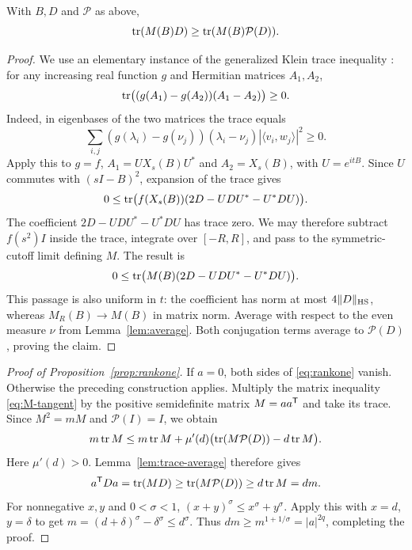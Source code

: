 \begin{lemma}\label{lem:trace-average}
With $B,D$ and $\mathcal P$ as above,
\begin{equation}\label{eq:trace-average}
 \operatorname{tr}(M(B)D)\ge\operatorname{tr}(M(B)\mathcal P(D)).
\end{equation}
\end{lemma}
\begin{proof}
We use an elementary instance of the generalized Klein trace inequality
\cite[Proposition~3, p.~289]{Petz1994}: for any increasing real function $g$ and
Hermitian matrices $A_1,A_2$,
\begin{equation}\label{eq:trace-monotonicity}
 \operatorname{tr}\bigl((g(A_1)-g(A_2))(A_1-A_2)\bigr)\ge0.
\end{equation}
Indeed, in eigenbases of the two matrices the trace equals
\[
 \sum_{i,j}(g(\lambda_i)-g(\nu_j))(\lambda_i-\nu_j)
       |\langle v_i,w_j\rangle|^2\ge0.
\]
Apply this to $g=f$, $A_1=UX_s(B)U^*$ and $A_2=X_s(B)$, with
$U=e^{itB}$. Since $U$ commutes with $(sI-B)^2$, expansion of the trace gives
\begin{equation}\label{eq:trace-fixed-s}
 0\le\operatorname{tr}\bigl(f(X_s(B))(2D-UDU^*-U^*DU)\bigr).
\end{equation}
The coefficient $2D-UDU^*-U^*DU$ has trace zero. We may therefore subtract
$f(s^2)I$ inside the trace, integrate over $[-R,R]$, and pass to the
symmetric-cutoff limit defining $M$. The result is
\[
 0\le\operatorname{tr}\bigl(M(B)(2D-UDU^*-U^*DU)\bigr).
\]
This passage is also uniform in $t$: the coefficient has norm at most
$4\|D\|_{\mathrm{HS}}$, whereas $M_R(B)\to M(B)$ in matrix norm.
Average with respect to the even measure $\nu$ from Lemma~\ref{lem:average}.
Both conjugation terms average to $\mathcal P(D)$, proving the claim.
\end{proof}

\begin{proof}[Proof of Proposition~\ref{prop:rankone}]
If $a=0$, both sides of \eqref{eq:rankone} vanish. Otherwise the preceding
construction applies. Multiply the matrix inequality
\eqref{eq:M-tangent} by the positive semidefinite matrix $M=aa^{\mathsf T}$
and take its trace. Since $M^2=mM$ and $\mathcal P(I)=I$, we obtain
\[
 m\operatorname{tr} M\le m\operatorname{tr} M+\mu'(d)
      \bigl(\operatorname{tr}(M\mathcal P(D))-d\operatorname{tr} M\bigr).
\]
Here $\mu'(d)>0$. Lemma~\ref{lem:trace-average} therefore gives
\[
 a^{\mathsf T}Da=\operatorname{tr}(MD)
 \ge\operatorname{tr}(M\mathcal P(D))\ge d\operatorname{tr} M=dm.
\]
For nonnegative $x,y$ and $0<\sigma<1$, $(x+y)^\sigma\le x^\sigma+y^\sigma$.
Apply this with $x=d$, $y=\delta$ to get
$m=(d+\delta)^\sigma-\delta^\sigma\le d^\sigma$.
Thus $dm\ge m^{1+1/\sigma}=|a|^{2q}$, completing the proof.
\end{proof}

